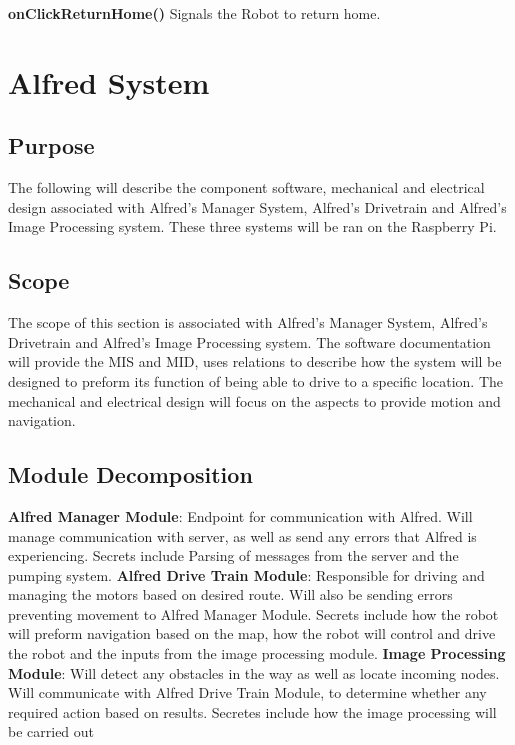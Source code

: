\documentclass [10pt]{article}
\begin{document}
\textbf{onClickReturnHome()}
Signals the Robot to return home.

\section {Alfred System}


\subsection{Purpose}
The following will describe the component software, mechanical and electrical design associated with Alfred's Manager System, Alfred's Drivetrain and Alfred's Image Processing system. These three systems will be ran on the Raspberry Pi. 

\subsection{Scope}

The scope of this section is associated with Alfred's Manager System, Alfred's Drivetrain and Alfred's Image Processing system. The software documentation will provide the MIS and MID, uses relations to describe how the system will be designed to preform its function of being able to drive to a specific location. The mechanical and electrical design will focus on the aspects to provide motion and navigation.


\subsection{Module Decomposition}

\textbf{Alfred Manager Module}: Endpoint for communication with Alfred. Will manage communication with server, as well as send any errors that Alfred is experiencing. Secrets include Parsing of messages from the server and the pumping system. 
\textbf{Alfred Drive Train Module}: Responsible for driving and managing the motors based on desired route. Will also be sending errors preventing movement to Alfred Manager Module. Secrets include how the robot will preform navigation based on the map, how the robot will control and drive the robot and the inputs from the image processing module.
\textbf{Image Processing Module}: Will detect any obstacles in the way as well as locate incoming nodes. Will communicate with Alfred Drive Train Module, to determine whether any required action based on results. Secretes include how the image processing will be carried out
\end{document}
